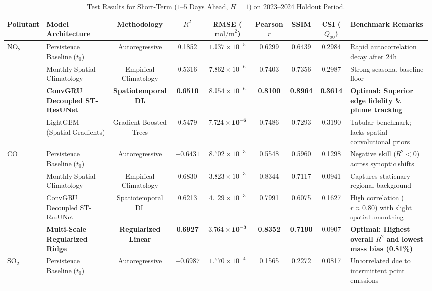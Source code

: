 ﻿\documentclass[10pt,a4paper]{article}
\begin{document}
\begin{table}[htbp]
\centering
\small
\caption{Test Results for Short-Term ($1$--$5$ Days Ahead, $H=1$) on 2023--2024 Holdout Period.}
\label{tab:short_term}
\begin{tabularx}{\textwidth}{llccccccX}
\toprule
\textbf{Pollutant} & \textbf{Model Architecture} & \textbf{Methodology} & \textbf{$R^2$} & \textbf{RMSE ($\text{mol/m}^2$)} & \textbf{Pearson $r$} & \textbf{SSIM} & \textbf{CSI ($Q_{90}$)} & \textbf{Benchmark Remarks} \\
\midrule
\multirow{4}{*}{\textbf{$\text{NO}_2$}} 
& Persistence Baseline ($t_0$) & Autoregressive & 0.1852 & $1.037 \times 10^{-5}$ & 0.6299 & 0.6439 & 0.2984 & Rapid autocorrelation decay after 24h \\
& Monthly Spatial Climatology & Empirical Climatology & 0.5316 & $7.862 \times 10^{-6}$ & 0.7403 & 0.7356 & 0.2987 & Strong seasonal baseline floor \\
& \textbf{ConvGRU Decoupled ST-ResUNet} & \textbf{Spatiotemporal DL} & \textbf{0.6510} & $8.054 \times 10^{-6}$ & \textbf{0.8100} & \textbf{0.8964} & \textbf{0.3614} & \textbf{Optimal: Superior edge fidelity \& plume tracking} \\
& LightGBM (Spatial Gradients) & Gradient Boosted Trees & 0.5479 & $\mathbf{7.724 \times 10^{-6}}$ & 0.7486 & 0.7293 & 0.3190 & Tabular benchmark; lacks spatial convolutional priors \\
\midrule
\multirow{4}{*}{\textbf{$\text{CO}$}} 
& Persistence Baseline ($t_0$) & Autoregressive & $-0.6431$ & $8.702 \times 10^{-3}$ & 0.5548 & 0.5960 & 0.1298 & Negative skill ($R^2 < 0$) across synoptic shifts \\
& Monthly Spatial Climatology & Empirical Climatology & 0.6830 & $3.823 \times 10^{-3}$ & 0.8344 & 0.7117 & 0.0941 & Captures stationary regional background \\
& ConvGRU Decoupled ST-ResUNet & Spatiotemporal DL & 0.6213 & $4.129 \times 10^{-3}$ & 0.7991 & 0.6075 & 0.1627 & High correlation ($r \approx 0.80$) with slight spatial smoothing \\
& \textbf{Multi-Scale Regularized Ridge} & \textbf{Regularized Linear} & \textbf{0.6927} & $\mathbf{3.764 \times 10^{-3}}$ & \textbf{0.8352} & \textbf{0.7190} & 0.0907 & \textbf{Optimal: Highest overall $R^2$ and lowest mass bias (0.81\%)} \\
\midrule
\multirow{4}{*}{\textbf{$\text{SO}_2$}} 
& Persistence Baseline ($t_0$) & Autoregressive & $-0.6987$ & $1.770 \times 10^{-4}$ & 0.1565 & 0.2272 & 0.0817 & Uncorrelated due to intermittent point emissions \\

\end{tabularx}
\end{table}
\end{document}

